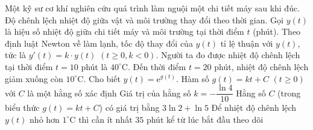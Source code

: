 \begin{ex}%
	Một kỹ sư cơ khí nghiên cứu quá trình làm nguội một chi tiết máy sau khi đúc. Độ chênh lệch nhiệt độ giữa vật và môi trường thay đổi theo thời gian. Gọi $y(t)$ là hiệu số nhiệt độ giữa chi tiết máy và môi trường tại thời điểm $t$ (phút). Theo định luật Newton về làm lạnh, tốc độ thay đổi của $y(t)$ tỉ lệ thuận với $y(t)$, tức là $y'(t)=k \cdot y(t)$ $(t\ge0,k<0)$. Người ta đo được nhiệt độ chênh lệch tại thời điểm $t=10$ phút là $40^\circ$C. Đến thời điểm $t=20$ phút, nhiệt độ chênh lệch giảm xuống còn $10^\circ$C. Cho biết $y(t)=\mathrm{e}^{g(t)}$.
	\choiceTF
	{\True Hàm số $g(t)=kt+C$ $(t\ge0)$ với $C$ là một hằng số xác định}
	{\True Giá trị của hằng số $k=-\dfrac{\ln 4}{10}$}
	{Hằng số $C$ (trong biểu thức $g(t)=kt+C$) có giá trị bằng $3\ln 2+\ln 5$}
	{Để nhiệt độ chênh lệch $y(t)$ nhỏ hơn $1^\circ$C thì cần ít nhất $35$ phút kể từ lúc bắt đầu theo dõi}
\end{ex}

\caukq

